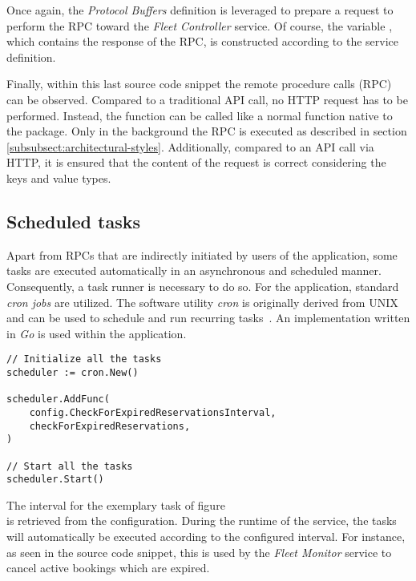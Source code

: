 \documentclass[12pt,a4paper,twoside]{report}
\begin{document}
Once again, the \textit{Protocol Buffers} definition is leveraged to prepare
a request to perform the RPC toward the \textit{Fleet Controller} service.
Of course, the variable , which contains the response of the RPC,
is constructed according to the service definition.

Finally, within this last source code snippet the remote procedure calls (RPC)
can be observed. Compared to a traditional API call, no HTTP request has to be
performed. Instead, the function 
can be called like a normal function native to the package.
Only in the background the RPC is executed as described
in section \ref{subsubsect:architectural-styles}.
Additionally, compared to an API call via HTTP, it is ensured that the content
of the request is correct considering the keys and value types.

\subsection{Scheduled tasks}

Apart from RPCs that are indirectly initiated by users of the application,
some tasks are executed automatically in an asynchronous and scheduled manner.
Consequently, a task runner is necessary to do so.
For the application, standard \textit{cron jobs} are utilized.
The software utility \textit{cron} is originally derived from UNIX and can be
used to schedule and run recurring tasks~\cite{crontab}.
An implementation written in \textit{Go} is used within the application.

\begin{lstlisting}[title=services/fleet-monitor/bookings.go, float, floatplacement=H]
// Initialize all the tasks
scheduler := cron.New()

scheduler.AddFunc(
    config.CheckForExpiredReservationsInterval,
    checkForExpiredReservations,
)

// Start all the tasks
scheduler.Start()
\end{lstlisting}

The interval for the exemplary task of figure\\
 is retrieved from the configuration.
During the runtime of the service, the tasks will automatically be executed
according to the configured interval.
For instance, as seen in the source code snippet, this is used by the
\textit{Fleet Monitor} service to cancel active bookings which are expired.
\end{document}
